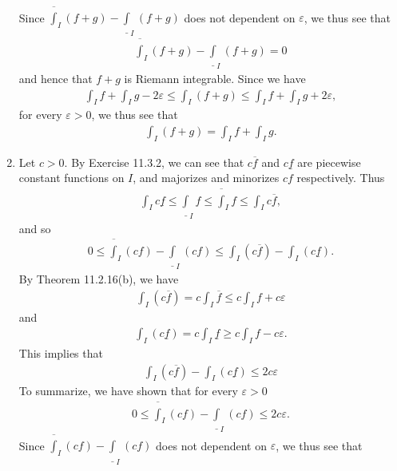 \documentclass{book}
\newcounter{Exercise}[section]
\begin{document}
\begin{enumerate}
\begin{align*}
        \end{align*}
    Since $\overline\int_{I}(f+g)-\underline\int_{I}(f+g)$ does not dependent on $\varepsilon$, we thus see that
        \begin{align*}
            \overline\int_{I}(f+g)-\underline\int_{I}(f+g)=0
        \end{align*}
    and hence that $f+g$ is Riemann integrable. Since we have
        \begin{align*}
            \int_{I}f+\int_{I}g-2\varepsilon
            \leq\int_{I}(f+g)
            \leq\int_{I}f+\int_{I}g+2\varepsilon,
        \end{align*}
    for every $\varepsilon>0$, we thus see that
        \begin{align*}
            \int_{I}(f+g)=\int_{I}f+\int_{I}g.
        \end{align*}
    \item Let $c>0$. By Exercise 11.3.2, we can see that $c\overline f$ and $c\underline f$ are piecewise constant functions on $I$, and majorizes and minorizes $cf$ respectively. Thus
        \begin{align*}
            \int_{I}c\underline f\leq\underline\int_{I}f\leq\overline\int_{I}f\leq\int_{I}c\overline f,
        \end{align*}
    and so
        \begin{align*}
            0\leq\overline\int_{I}(cf)-\underline\int_{I}(cf)
            \leq\int_{I}(c\overline f)-\int_{I}(c\underline f).
        \end{align*}
    By Theorem 11.2.16(b), we have
        \begin{align*}
            \int_{I}(c\overline f)=c\int_{I}\overline f\leq c\int_{I}f+c\varepsilon
        \end{align*}
    and
        \begin{align*}
            \int_{I}(c\underline f)=c\int_{I}\underline f\geq c\int_{I}f-c\varepsilon.
        \end{align*}
    This implies that
        \begin{align*}
            \int_{I}(c\overline f)-\int_{I}(c\underline f)\leq 2c\varepsilon
        \end{align*}
    To summarize, we have shown that for every $\varepsilon>0$
        \begin{align*}
            0\leq\overline\int_{I}(cf)-\underline\int_{I}(cf)
            \leq 2c\varepsilon.
        \end{align*}
    Since $\overline\int_{I}(cf)-\underline\int_{I}(cf)$ does not dependent on $\varepsilon$, we thus see that

\end{enumerate}
\end{document}
